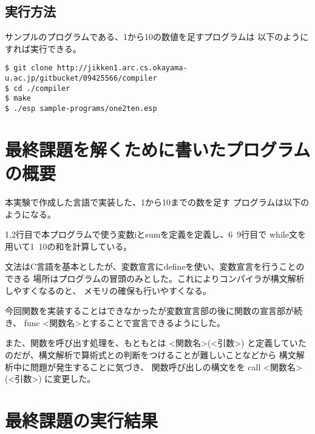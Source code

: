 \documentclass[11pt,a4j]{jarticle}
\begin{document}
\subsection{実行方法}

サンプルのプログラムである、1から10の数値を足すプログラムは
以下のようにすれば実行できる。

\begin{verbatim}
$ git clone http://jikken1.arc.cs.okayama-u.ac.jp/gitbucket/09425566/compiler
$ cd ./compiler
$ make 
$ ./esp sample-programs/one2ten.esp
\end{verbatim}



\section{最終課題を解くために書いたプログラムの概要}

本実験で作成した言語で実装した、1から10までの数を足す
プログラムは以下のようになる。

\vspace{0.2in}



\vspace{0.2in}

1,2行目で本プログラムで使う変数iとsumを定義を定義し、6~9行目で
while文を用いて1~10の和を計算している。


文法はC言語を基本としたが、変数宣言にdefineを使い、変数宣言を行うことのできる
場所はプログラムの冒頭のみとした。これによりコンパイラが構文解析しやすくなるのと、
メモリの確保も行いやすくなる。

\vspace{0.2in}

今回関数を実装することはできなかったが変数宣言部の後に関数の宣言部が続き、
func <関数名>とすることで宣言できるようにした。

また、関数を呼び出す処理を、もともとは <関数名>(<引数>) 
と定義していたのだが、構文解析で算術式との判断をつけることが難しいことなどから
構文解析中に問題が発生することに気づき、
関数呼び出しの構文をを call <関数名>(<引数>) に変更した。



\section{最終課題の実行結果} %
\end{document}
